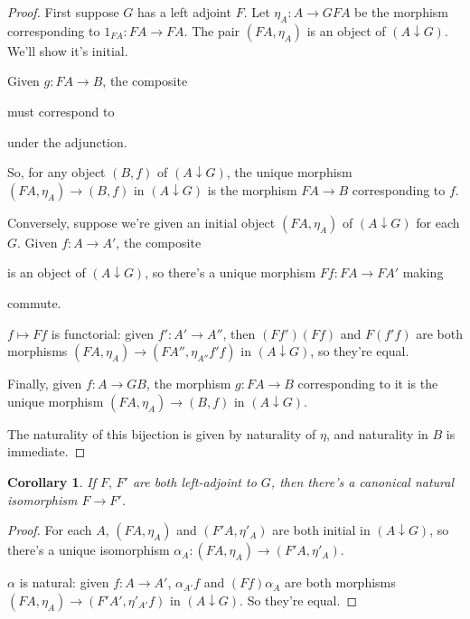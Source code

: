 \documentclass[a4paper]{article}
\newtheorem{corollary}[definition]{Corollary}
\numberwithin{definition}{section}
\begin{document}
\begin{proof}
	First suppose $G$ has a left adjoint $F$.
	Let $\eta_A: A \to GFA$ be the morphism corresponding to $1_{FA}:FA \to FA$.
	The pair $(FA, \eta_A)$ is an object of $(A \downarrow G)$.
	We'll show it's initial.
	
	Given $g: FA \to B$,
	the composite
	must correspond to
	under the adjunction.
	
	So, for any object $(B, f)$ of $(A \downarrow G)$,
	the unique morphism $(FA, \eta_A) \to (B, f)$ in $(A \downarrow G)$ is the morphism $FA \to B$ corresponding to $f$.
	
	Conversely, suppose we're given an initial object $(FA, \eta_A)$ of $(A \downarrow G)$ for each $G$.
	Given $f: A \to A'$,
	the composite
	is an object of $(A \downarrow G)$,
	so there's a unique morphism $Ff: FA \to FA'$ making
	\begin{center}
	\end{center}
	commute.
	
	$f \mapsto Ff$ is functorial:
	given $f': A' \to A''$,
	then $(Ff')(Ff)$ and $F(f'f)$ are both morphisms $(FA, \eta_A) \to (FA'', \eta_{A''}f'f)$ in $(A \downarrow G)$,
	so they're equal.
	
	Finally, given $f: A \to GB$,
	the morphism $g: FA \to B$ corresponding to it is the unique morphism $(FA, \eta_A) \to (B, f)$ in $(A \downarrow G)$.
	
	The naturality of this bijection is given by naturality of $\eta$,
	and naturality in $B$ is immediate.
\end{proof}

\begin{corollary}
	If $F,\, F'$ are both left-adjoint to $G$,
	then there's a canonical natural isomorphism $F \to F'$.
\end{corollary}
\begin{proof}
	For each $A$,
	$(FA, \eta_A)$ and $(F'A, \eta'_A)$ are both initial in $(A \downarrow G)$,
	so there's a unique isomorphism $\alpha_A: (FA, \eta_A) \to (F'A, \eta'_A)$.
	
	$\alpha$ is natural: given $f: A \to A'$,
	$\alpha_{A'}f$ and $(Ff)\alpha_A$ are both morphisms $(FA, \eta_A) \to (F'A', \eta'_{A'}f)$ in $(A \downarrow G)$.
	So they're equal.
\end{proof}
\end{document}
